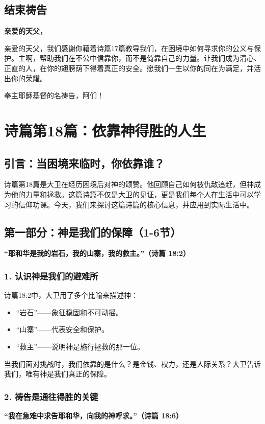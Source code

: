 \documentclass[a4paper, 12pt]{article}
\begin{document}
\subsection*{结束祷告}
\textbf{亲爱的天父，}

亲爱的天父，我们感谢你藉着诗篇17篇教导我们，在困境中如何寻求你的公义与保护。主啊，帮助我们在不公中信靠你，而不是倚靠自己的力量。让我们成为清心、正直的人，在你的翅膀荫下得着真正的安全。愿我们一生以你的同在为满足，并活出你的荣耀。

奉主耶稣基督的名祷告，阿们！
\newpage
\section{诗篇第18篇：依靠神得胜的人生}

\subsection*{引言：当困境来临时，你依靠谁？}

诗篇第18篇是大卫在经历困境后对神的颂赞。他回顾自己如何被仇敌追赶，但神成为他的力量和拯救。这篇诗篇不仅是大卫的见证，更是我们每个人在生活中可以学习的信仰功课。今天，我们来探讨这篇诗篇的核心信息，并应用到实际生活中。

\subsection*{第一部分：神是我们的保障（1-6节）}

\textbf{“耶和华是我的岩石，我的山寨，我的救主。”（诗篇 18:2）}

\subsubsection*{1. 认识神是我们的避难所}
诗篇18:2中，大卫用了多个比喻来描述神：
\begin{itemize}
    \item “岩石”——象征稳固和不可动摇。
    \item “山寨”——代表安全和保护。
    \item “救主”——说明神是施行拯救的那一位。
\end{itemize}

当我们面对挑战时，我们依靠的是什么？是金钱、权力，还是人际关系？大卫告诉我们，唯有神是我们真正的保障。

\subsubsection*{2. 祷告是通往得胜的关键}
\textbf{“我在急难中求告耶和华，向我的神呼求。”（诗篇 18:6）}
\end{document}
